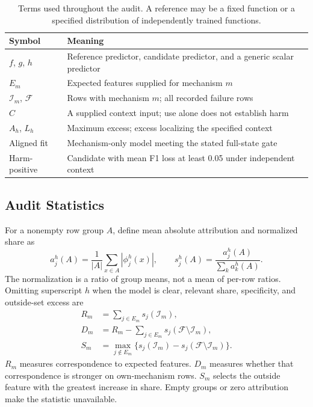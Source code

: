 \documentclass[conference]{IEEEtran}
\begin{document}
\begin{table}[t]
\centering
\caption{Terms used throughout the audit. A reference may be a fixed function or a specified distribution of independently trained functions.}
\label{tab:notation}
\footnotesize
\begin{tabular}{L{0.14\columnwidth}L{0.76\columnwidth}}
\toprule
Symbol & Meaning \\
\midrule
$f$, $g$, $h$ & Reference predictor, candidate predictor, and a generic scalar predictor \\
$E_m$ & Expected features supplied for mechanism $m$ \\
$\mathcal I_m$, $\mathcal F$ & Rows with mechanism $m$; all recorded failure rows \\
$C$ & A supplied context input; use alone does not establish harm \\
$A_h$, $L_h$ & Maximum excess; excess localizing the specified context \\
Aligned fit & Mechanism-only model meeting the stated full-state gate \\
Harm-positive & Candidate with mean F1 loss at least 0.05 under independent context \\
\bottomrule
\end{tabular}
\end{table}

\subsection{Audit Statistics}
For a nonempty row group $A$, define mean absolute attribution and normalized share as
\begin{equation}
 a_j^h(A)=\frac{1}{|A|}\sum_{x\in A}|\phi_j^h(x)|,
 \qquad s_j^h(A)=\frac{a_j^h(A)}{\sum_k a_k^h(A)}.
\end{equation}
The normalization is a ratio of group means, not a mean of per-row ratios. Omitting superscript $h$ when the model is clear, relevant share, specificity, and outside-set excess are
\begin{align}
 R_m&=\sum_{j\in E_m}s_j(\mathcal I_m),\\
 D_m&=R_m-\sum_{j\in E_m}s_j(\mathcal F\setminus\mathcal I_m),\\
 S_m&=\max_{j\notin E_m}\{s_j(\mathcal I_m)-s_j(\mathcal F\setminus\mathcal I_m)\}.
 \label{eq:outside}
\end{align}
$R_m$ measures correspondence to expected features. $D_m$ measures whether that correspondence is stronger on own-mechanism rows. $S_m$ selects the outside feature with the greatest increase in share. Empty groups or zero attribution make the statistic unavailable.
\end{document}
